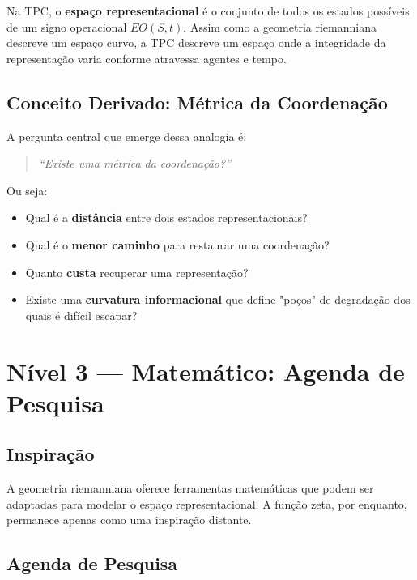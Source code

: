 \documentclass[12pt,a4paper]{article}
\begin{document}
Na TPC, o \textbf{espaço representacional} é o conjunto de todos os estados possíveis de um signo operacional \( EO(S,t) \). Assim como a geometria riemanniana descreve um espaço curvo, a TPC descreve um espaço onde a integridade da representação varia conforme atravessa agentes e tempo.

\subsection{Conceito Derivado: Métrica da Coordenação}

A pergunta central que emerge dessa analogia é:

\begin{quote}
\emph{``Existe uma métrica da coordenação?''}
\end{quote}

Ou seja:
\begin{itemize}
    \item Qual é a \textbf{distância} entre dois estados representacionais?
    \item Qual é o \textbf{menor caminho} para restaurar uma coordenação?
    \item Quanto \textbf{custa} recuperar uma representação?
    \item Existe uma \textbf{curvatura informacional} que define "poços" de degradação dos quais é difícil escapar?
\end{itemize}

\section{Nível 3 — Matemático: Agenda de Pesquisa}

\subsection{Inspiração}

A geometria riemanniana oferece ferramentas matemáticas que podem ser adaptadas para modelar o espaço representacional. A função zeta, por enquanto, permanece apenas como uma inspiração distante.

\subsection{Agenda de Pesquisa}
\end{document}
